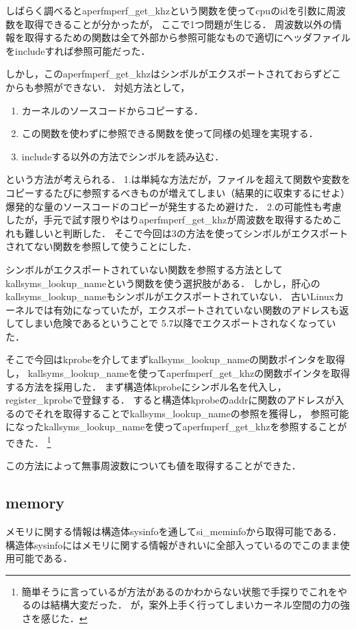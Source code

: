 しばらく調べるとaperfmperf\_get\_khzという関数を使ってcpuのidを引数に周波数を取得できる\cite{aperf}ことが分かったが，
ここで1つ問題が生じる．
周波数以外の情報を取得するための関数は全て外部から参照可能なもので適切にヘッダファイルをincludeすれば参照可能だった．

しかし，このaperfmperf\_get\_khzはシンボルがエクスポートされておらずどこからも参照ができない．
対処方法として，
\begin{enumerate}
    \item カーネルのソースコードからコピーする．
    \item この関数を使わずに参照できる関数を使って同様の処理を実現する．
    \item includeする以外の方法でシンボルを読み込む．
\end{enumerate}

という方法が考えられる．
1.は単純な方法だが，ファイルを超えて関数や変数をコピーするたびに参照するべきものが増えてしまい（結果的に収束するにせよ）
爆発的な量のソースコードのコピーが発生するため避けた．
2.の可能性も考慮したが，手元で試す限りやはりaperfmperf\_get\_khzが周波数を取得するためこれも難しいと判断した．
そこで今回は3の方法を使ってシンボルがエクスポートされてない関数を参照して使うことにした．

シンボルがエクスポートされていない関数を参照する方法としてkallsyms\_lookup\_nameという関数を使う選択肢がある．
しかし，肝心のkallsyms\_lookup\_nameもシンボルがエクスポートされていない．
古いLinuxカーネルでは有効になっていたが，エクスポートされていない関数のアドレスも返してしまい危険であるということで
5.7以降でエクスポートされなくなっていた．\cite{kallsyms}

そこで今回はkprobeを介してまずkallsyms\_lookup\_nameの関数ポインタを取得し，
kallsyms\_lookup\_nameを使ってaperfmperf\_get\_khzの関数ポインタを取得する方法を採用した．
まず構造体kprobeにシンボル名を代入し，register\_kprobeで登録する．
すると構造体kprobeのaddrに関数のアドレスが入るのでそれを取得することでkallsyms\_lookup\_nameの参照を獲得し，
参照可能になったkallsyms\_lookup\_nameを使ってaperfmperf\_get\_khzを参照することができた．
\footnote{簡単そうに言っているが方法があるのかわからない状態で手探りでこれをやるのは結構大変だった．
が，案外上手く行ってしまいカーネル空間の力の強さを感じた．}

この方法によって無事周波数についても値を取得することができた．

\subsection{memory}
メモリに関する情報は構造体sysinfoを通してsi\_meminfoから取得可能である．\cite{meminfo}
構造体sysinfoにはメモリに関する情報がきれいに全部入っているのでこのまま使用可能である．

